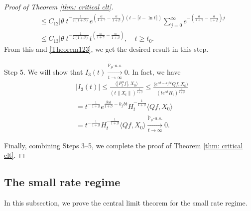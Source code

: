 \documentclass[12pt,a4paper]{amsart}
\theoremstyle{plain}
\theoremstyle{definition}
\numberwithin{equation}{section}
\begin{document}
\begin{proof}[Proof of Theorem \ref{thm: critical clt}]
\begin{align}
    &\leq C_{12} |\theta| t^{-\frac{1}{2(1+\beta)}}e^{(\frac{\alpha }{1+\gamma}-\frac{\alpha }{1+\beta})(t - \lceil t - \ln t\rceil)} \sum_{j=0}^{\infty}e^{-(\frac{\alpha}{1+\gamma}-\frac{\alpha}{1+\beta})j}\\
    &\leq C_{13}|\theta| t^{-\frac{1}{2(1+\beta)}}t^{(\frac{\alpha}{1+\gamma}- \frac{\alpha}{1+\beta})},
    \quad t\geq t_0.
\end{align}
	From this and \eqref{Theorem123}, we get the desired result in this step.

	Step 5.
    We will show that $I_3(t) \xrightarrow[t\to \infty]{\tilde {\mathbb P}_\mu \text{-} a.s.} 0$.
    In fact, we have
\begin{align}
	&|I_3(t)|
\leq \frac{\langle |P^\alpha_tf|,X_0\rangle}{(t\|X_t\|)^{\frac{1}{1+\beta}}}
	\leq \frac{\langle e^{\alpha t - \kappa_f b t}Qf,X_0\rangle}{(te^{\alpha t} H_t)^{\frac{1}{1+\beta}}}
	\\& = t^{-\frac{1}{1+\beta}} e^{\frac{\beta \alpha t}{1+\beta} - k_fbt} H_t^{-\frac{1}{1+\beta}} \langle Qf,X_0\rangle
	\\& = t^{-\frac{1}{1+\beta}} H_t^{-\frac{1}{1+\beta}} \langle Qf,X_0\rangle
	\xrightarrow[t\to \infty]{\tilde {\mathbb P}_\mu \text{-} a.s.} 0.
\end{align}

	Finally, combining Steps 3--5, we complete the proof of Theorem \ref{thm: critical clt}.
\end{proof}

\subsection{The small rate regime}
\label{sec: small rate}

    In this subsection, we prove the central limit theorem for the small rate regime.
\end{document}
